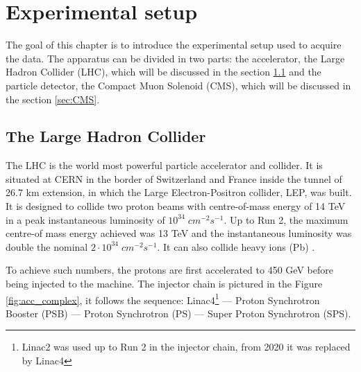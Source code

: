 \chapter{Experimental setup} \label{chap:experiment}

The goal of this chapter is to introduce the experimental setup used to acquire the data. The apparatus can be divided in two parts: the accelerator, the Large Hadron Collider (LHC), which will be discussed in the section \ref{sec:LHC} and the particle detector, the Compact Muon Solenoid (CMS), which will be discussed in the section \ref{sec:CMS}.

\section{The Large Hadron Collider}\label{sec:LHC}

The LHC is the world most powerful particle accelerator and collider. It is  situated at CERN in the border of Switzerland and France inside the tunnel of 26.7 km extension, in which the Large Electron-Positron collider, LEP, was built. It is designed to collide two proton beams with centre-of-mass energy of 14 TeV in a peak instantaneous luminosity of $10^{34} \; cm^{-2} s^{-1}$. Up to Run 2, the maximum centre-of mass energy achieved was 13 TeV and the instantaneous luminosity was double the nominal $2 \cdot 10^{34} \; cm^{-2} s^{-1}$. It can also collide heavy ions (Pb) \cite{Evans_2008}.

To achieve such numbers, the protons are first accelerated to 450 GeV before being injected to the machine. The injector chain is pictured in the Figure \ref{fig:acc_complex}, it follows the sequence: Linac4\footnote{Linac2 was used up to Run 2 in the injector chain, from 2020 it was replaced by Linac4} — Proton Synchrotron Booster (PSB) — Proton Synchrotron (PS) — Super Proton Synchrotron (SPS). 

